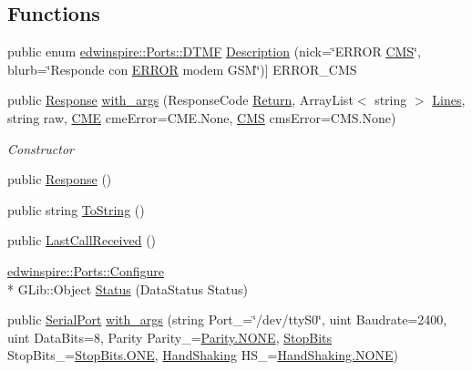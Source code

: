 \subsection*{Functions}
\begin{DoxyCompactItemize}
\item 
public enum \hyperlink{namespaceedwinspire_1_1_ports_af4e0ec730b70610713b98825eb7c6f53}{edwinspire\-::\-Ports\-::\-D\-T\-M\-F} \hyperlink{namespaceedwinspire_1_1_ports_aca82b59bbf3249fe74227599ba5a813b}{Description} (nick=\char`\"{}E\-R\-R\-O\-R \hyperlink{namespaceedwinspire_1_1_ports_aa6e4441b65db895e600a13038b3d5ff4}{C\-M\-S}\char`\"{}, blurb=\char`\"{}Responde con \hyperlink{namespaceedwinspire_1_1_ports_ab432ddd57eaa78866b8ce320fdb31d01}{E\-R\-R\-O\-R} modem G\-S\-M\char`\"{})\mbox{]} E\-R\-R\-O\-R\-\_\-\-C\-M\-S
\item 
public \hyperlink{namespaceedwinspire_1_1_ports_afc37e1ee0b1084b5c5fccf2fab440b4f}{Response} \hyperlink{namespaceedwinspire_1_1_ports_a6ef86265a936a529ea91a077ab2f2ca3}{with\-\_\-args} (Response\-Code \hyperlink{namespaceedwinspire_1_1_ports_a8b086f30ecfbef96ca3e5f5642767975}{Return}, Array\-List$<$ string $>$ \hyperlink{namespaceedwinspire_1_1_ports_a6989ba34677ae553d4d312c9ae744532}{Lines}, string raw, \hyperlink{namespaceedwinspire_1_1_ports_ace89e61880474073c93815c34c52fe0d}{C\-M\-E} cme\-Error=C\-M\-E.\-None, \hyperlink{namespaceedwinspire_1_1_ports_aa6e4441b65db895e600a13038b3d5ff4}{C\-M\-S} cms\-Error=C\-M\-S.\-None)
\begin{DoxyCompactList}\small\item\em Constructor \end{DoxyCompactList}\item 
public \hyperlink{namespaceedwinspire_1_1_ports_afc37e1ee0b1084b5c5fccf2fab440b4f}{Response} ()
\item 
public string \hyperlink{namespaceedwinspire_1_1_ports_a1d54df4f08e40e31578925d13f6ee9c6}{To\-String} ()
\item 
public \hyperlink{namespaceedwinspire_1_1_ports_a1cb04d0401c5f2277711b286f3199061}{Last\-Call\-Received} ()
\item 
\hyperlink{classedwinspire_1_1_ports_1_1_configure}{edwinspire\-::\-Ports\-::\-Configure} \\*
G\-Lib\-::\-Object \hyperlink{namespaceedwinspire_1_1_ports_aa3f7c9d23312aa446f2b0b8f52efdf34}{Status} (Data\-Status Status)
\item 
public \hyperlink{namespaceedwinspire_1_1_ports_a293ef58b4105463e6bd4b2d5ad9b3144}{Serial\-Port} \hyperlink{namespaceedwinspire_1_1_ports_a9de2452f18841a5338e2c45fbc8cca2d}{with\-\_\-args} (string Port\-\_\-=\char`\"{}/dev/tty\-S0\char`\"{}, uint Baudrate=2400, uint Data\-Bits=8, Parity Parity\-\_\-=\hyperlink{libspire__serial_8vala_a899caa602e4fff675b17cdbab33607ec}{Parity.\-N\-O\-N\-E}, \hyperlink{namespaceedwinspire_1_1_ports_a2e4c31ec0a94db405865b7c241717fbe}{Stop\-Bits} Stop\-Bits\-\_\-=\hyperlink{libspire__serial_8vala_a2cb8470634cc90a55800ee95f967eade}{Stop\-Bits.\-O\-N\-E}, \hyperlink{namespaceedwinspire_1_1_ports_a3c4e827e4f2f517f8020ab56c3eaa742}{Hand\-Shaking} H\-S\-\_\-=\hyperlink{libspire__serial_8vala_a899caa602e4fff675b17cdbab33607ec}{Hand\-Shaking.\-N\-O\-N\-E})

\end{DoxyCompactItemize}
